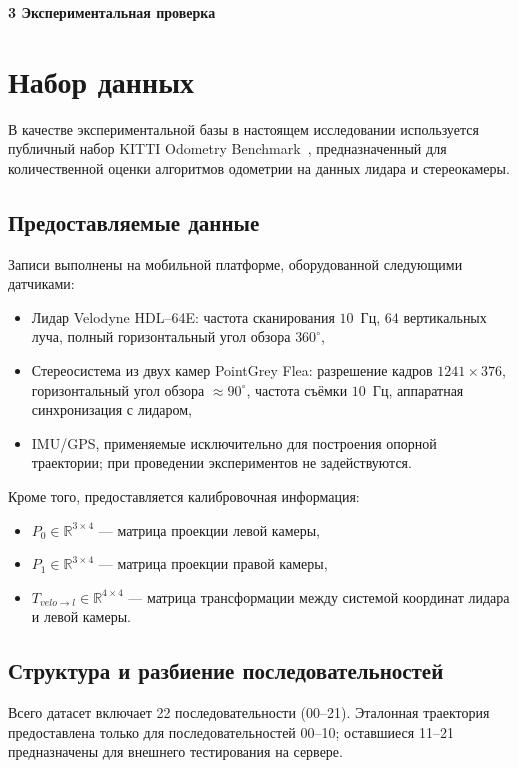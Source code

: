 \newpage
\begin{center}
  \textbf{\large 3 Экспериментальная проверка}
\end{center}

\section{Набор данных}
\label{sec:dataset_kitti_odom}
В качестве экспериментальной базы в настоящем исследовании используется
публичный набор KITTI Odometry Benchmark~\cite{geiger2013vision},
предназначенный для количественной оценки алгоритмов одометрии на данных
лидара и стереокамеры.

\subsection{Предоставляемые данные}
Записи выполнены на мобильной платформе, оборудованной следующими датчиками:
\begin{itemize}
    \item {Лидар} Velodyne HDL–64E: частота сканирования $10$~Гц,
          $64$ вертикальных луча, полный горизонтальный угол обзора
          $360^{\circ}$,
    \item {Стереосистема} из двух камер PointGrey Flea:
          разрешение кадров $1241\times376$,
          горизонтальный угол обзора $\approx 90^{\circ}$,
          частота съёмки $10$~Гц, аппаратная синхронизация с лидаром,
    \item {IMU/GPS}, применяемые исключительно для построения
          опорной траектории; при проведении экспериментов не задействуются.
\end{itemize}

Кроме того, предоставляется калибровочная информация:
\begin{itemize}
  \item $P_0 \in \mathbb{R}^{3\times 4}$ --- матрица проекции левой камеры,
  \item $P_1 \in \mathbb{R}^{3\times 4}$ --- матрица проекции правой камеры,
  \item $T_{velo\rightarrow l} \in \mathbb{R}^{4\times 4}$ --- матрица трансформации между системой координат лидара и левой камеры.
\end{itemize}

\subsection{Структура и разбиение последовательностей}
Всего датасет включает 22 последовательности
({00--21}). Эталонная траектория предоставлена
только для последовательностей {00--10}; оставшиеся
{11--21} предназначены для внешнего тестирования на сервере.

